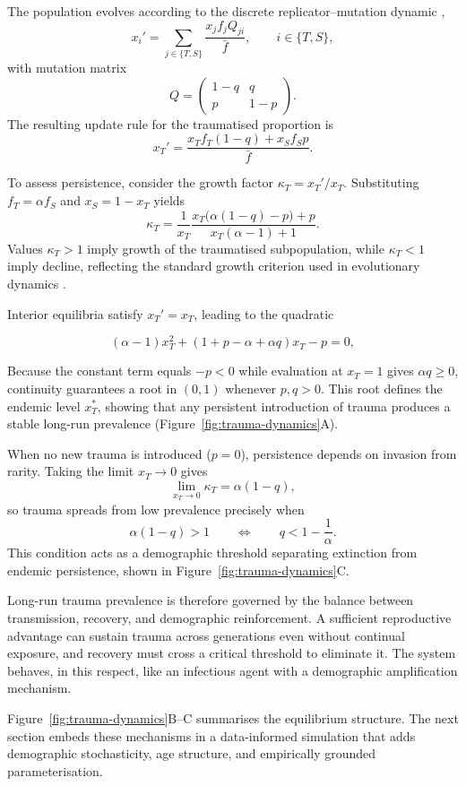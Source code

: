 \documentclass{article}
\begin{document}
The population evolves according to the discrete replicator--mutation dynamic
\cite{imhof2005evolutionary,nowak2006evolutionary},
\[
x_i'=\sum_{j\in\{T,S\}}\frac{x_j f_j Q_{ji}}{\bar f},
\qquad i\in\{T,S\},
\]
with mutation matrix
\[
Q=
\begin{pmatrix}
1-q & q \\
p   & 1-p
\end{pmatrix}.
\]
The resulting update rule for the traumatised proportion is
\[
x_T'
=\frac{x_T f_T(1-q)+x_S f_S p}{\bar f}.
\]

To assess persistence, consider the growth factor
\(\kappa_T=x_T'/x_T\).
Substituting \(f_T=\alpha f_S\) and \(x_S=1-x_T\) yields
\[
\kappa_T
=\frac{1}{x_T}
\frac{x_T\bigl(\alpha(1-q)-p\bigr)+p}{x_T(\alpha-1)+1}.
\]
Values \(\kappa_T>1\) imply growth of the traumatised subpopulation,
while \(\kappa_T<1\) imply decline, reflecting the standard 
growth criterion used in evolutionary dynamics
\cite{nowak2006evolutionary,hofbauer1998evolutionary}.

Interior equilibria satisfy \(x_T'=x_T\), leading to the quadratic

\[
(\alpha-1)x_T^2+(1+p-\alpha+\alpha q)x_T-p=0,
\]

Because the constant term equals \(-p<0\) while evaluation at
\(x_T=1\) gives \(\alpha q\ge0\), continuity guarantees a root in
\((0,1)\) whenever \(p,q>0\).
This root defines the endemic level \(x_T^*\), showing that any
persistent introduction of trauma produces a stable long-run
prevalence (Figure~\ref{fig:trauma-dynamics}A).

When no new trauma is introduced (\(p=0\)), persistence depends on invasion
from rarity. Taking the limit \(x_T\to0\) gives
\[
\lim_{x_T\to0}\kappa_T=\alpha(1-q),
\]
so trauma spreads from low prevalence precisely when
\[
\alpha(1-q)>1
\qquad\Longleftrightarrow\qquad
q<1-\frac{1}{\alpha}.
\]
This condition acts as a demographic threshold separating extinction from
endemic persistence, shown in Figure~\ref{fig:trauma-dynamics}C.

\medskip

Long-run trauma prevalence is therefore governed by the balance between
transmission, recovery, and demographic reinforcement. A sufficient reproductive
advantage can sustain trauma across generations even without continual exposure,
and recovery must cross a critical threshold to eliminate it. The system behaves,
in this respect, like an infectious agent with a demographic amplification
mechanism.

Figure~\ref{fig:trauma-dynamics}B--C summarises the equilibrium structure.
The next section embeds these mechanisms in a data-informed simulation that
adds demographic stochasticity, age structure, and empirically grounded
parameterisation.
\end{document}
